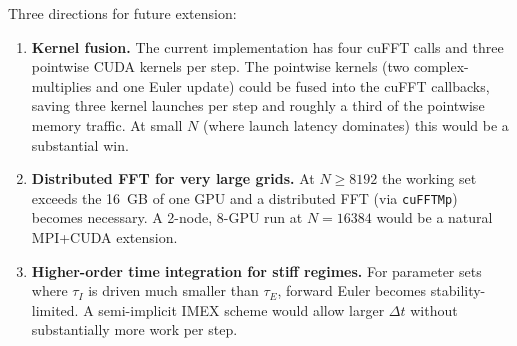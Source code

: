 \documentclass[11pt]{article}
\begin{document}
\label{sec:future}
Three directions for future extension:
\begin{enumerate}
  \item \textbf{Kernel fusion.} The current implementation has four
  cuFFT calls and three pointwise CUDA kernels per step. The pointwise
  kernels (two complex-multiplies and one Euler update) could be
  fused into the cuFFT callbacks, saving three kernel launches per
  step and roughly a third of the pointwise memory traffic. At small
  $N$ (where launch latency dominates) this would be a substantial
  win.
  \item \textbf{Distributed FFT for very large grids.} At
  $N \geq 8192$ the working set exceeds the \SI{16}{GB} of one GPU
  and a distributed FFT (via \texttt{cuFFTMp}) becomes necessary. A
  2-node, 8-GPU run at $N = 16384$ would be a natural MPI+CUDA
  extension.
  \item \textbf{Higher-order time integration for stiff regimes.} For
  parameter sets where $\tau_{I}$ is driven much smaller than
  $\tau_{E}$, forward Euler becomes stability-limited. A semi-implicit
  IMEX scheme would allow larger $\Delta t$ without substantially
  more work per step.
\end{enumerate}



\end{document}
